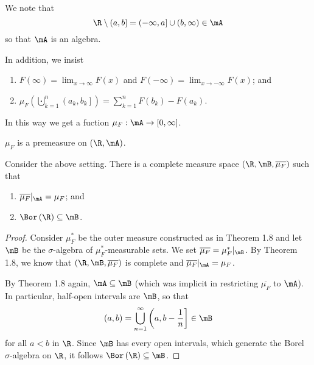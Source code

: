 \documentclass[pmath451]{subfiles}
\begin{document}
    We note that
    \begin{equation*}
        \R\setminus\left( a,b \right] = \left( -\infty,a \right]\cup\left( b,\infty \right)\in\mA
    \end{equation*}
    so that $\mA$ is an algebra.

    In addition, we insist
    \begin{enumerate}
        \item $F\left( \infty \right) = \lim_{x\to\infty}F\left( x \right)$ and $F\left( -\infty \right) = \lim_{x\to-\infty}F\left( x \right)$; and
        \item $\mu_F\left( \bigcupdot^{n}_{k=1}\left( a_k,b_k \right] \right) = \sum^{n}_{k=1} F\left( b_k \right)-F\left( a_k \right)$.
    \end{enumerate}
    In this way we get a fuction $\mu_F:\mA\to\left[ 0,\infty \right]$.

    \begin{fact}{}
        $\mu_F$ is a premeasure on $\left( \R,\mA \right)$.
    \end{fact}

    \begin{theorem}{}
        Consider the above setting. There is a complete measure space $\left( \R,\mB,\overline{\mu_F} \right)$ such that
        \begin{enumerate}
            \item $\overline{\mu_F}|_{\mA} = \mu_F$; and
            \item $\Bor\left( \R \right)\subseteq\mB$.
        \end{enumerate}
    \end{theorem}

    \clearpage

    \begin{proof}
        Consider $\mu_F^{*}$ be the outer measure constructed as in Theorem 1.8 and let $\mB$ be the $\sigma$-algebra of $\mu_F^{*}$-measurable sets. We set $\overline{\mu_F} = \mu_F^{*}|_{\mB}$. By Theorem 1.8, we know that $\left( \R,\mB,\overline{\mu_F} \right)$ is complete and $\overline{\mu_F}|_{\mA} = \mu_F$.

        By Theorem 1.8 again, $\mA\subseteq\mB$ (which was implicit in restricting $\overline{\mu_F}$ to $\mA$). In particular, half-open intervals are $\mB$, so that
        \begin{equation*}
            \left( a,b \right) = \bigcup^{\infty}_{n=1} \left( a,b-\frac{1}{n} \right]\in\mB
        \end{equation*}
        for all $a<b$ in $\R$. Since $\mB$ has every open intervals, which generate the Borel $\sigma$-algebra on $\R$, it follows $\Bor\left( \R \right)\subseteq\mB$.
    \end{proof}
\end{document}
